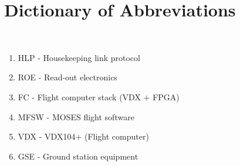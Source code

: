 %
\section{\bf Dictionary of Abbreviations }
\hrulefill
\\
\begin{enumerate}

\item HLP - Housekeeping link protocol
\item ROE - Read-out electronics
\item FC - Flight computer stack (VDX + FPGA)
\item MFSW - MOSES flight software
\item VDX - VDX104+ (Flight computer)
\item GSE - Ground station equipment

\end{enumerate}

